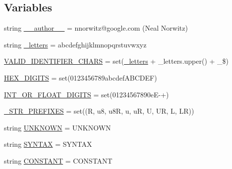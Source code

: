 \subsection*{Variables}
\begin{DoxyCompactItemize}
\item 
string \hyperlink{namespacecpp_1_1tokenize_a13ec118ce7f7df6ecd18b3c74d37708a}{\+\_\+\+\_\+author\+\_\+\+\_\+} = \textquotesingle{}nnorwitz@google.\+com (Neal Norwitz)\textquotesingle{}
\item 
string \hyperlink{namespacecpp_1_1tokenize_ab5a9d36b61d51e76473c383db9e4b934}{\+\_\+letters} = \textquotesingle{}abcdefghijklmnopqrstuvwxyz\textquotesingle{}
\item 
\hyperlink{namespacecpp_1_1tokenize_a733f1cf605b1630fb6a0a7f30aaefbec}{V\+A\+L\+I\+D\+\_\+\+I\+D\+E\+N\+T\+I\+F\+I\+E\+R\+\_\+\+C\+H\+A\+RS} = set(\hyperlink{namespacecpp_1_1tokenize_ab5a9d36b61d51e76473c383db9e4b934}{\+\_\+letters} + \+\_\+letters.\+upper() + \textquotesingle{}\+\_\$\textquotesingle{})
\item 
\hyperlink{namespacecpp_1_1tokenize_a8b45b0f0f2b504757e9ede9c342b2c36}{H\+E\+X\+\_\+\+D\+I\+G\+I\+TS} = set(\textquotesingle{}0123456789abcdef\+A\+B\+C\+D\+E\+F\textquotesingle{})
\item 
\hyperlink{namespacecpp_1_1tokenize_ad8c6dd06d4e6ef2e24e9186acb0aff43}{I\+N\+T\+\_\+\+O\+R\+\_\+\+F\+L\+O\+A\+T\+\_\+\+D\+I\+G\+I\+TS} = set(\textquotesingle{}01234567890e\+E-\/+\textquotesingle{})
\item 
\hyperlink{namespacecpp_1_1tokenize_aef952930004258aec982a51c8875e82a}{\+\_\+\+S\+T\+R\+\_\+\+P\+R\+E\+F\+I\+X\+ES} = set((\textquotesingle{}R\textquotesingle{}, \textquotesingle{}u8\textquotesingle{}, \textquotesingle{}u8R\textquotesingle{}, \textquotesingle{}u\textquotesingle{}, \textquotesingle{}uR\textquotesingle{}, \textquotesingle{}U\textquotesingle{}, \textquotesingle{}UR\textquotesingle{}, \textquotesingle{}L\textquotesingle{}, \textquotesingle{}LR\textquotesingle{}))
\item 
string \hyperlink{namespacecpp_1_1tokenize_a0dfd65c08216eed29f74a64b603ac540}{U\+N\+K\+N\+O\+WN} = \textquotesingle{}U\+N\+K\+N\+O\+WN\textquotesingle{}
\item 
string \hyperlink{namespacecpp_1_1tokenize_a1655e62b60899059935930c81ba25c01}{S\+Y\+N\+T\+AX} = \textquotesingle{}S\+Y\+N\+T\+AX\textquotesingle{}
\item 
string \hyperlink{namespacecpp_1_1tokenize_a5e3bf1014a301906871113a989188a78}{C\+O\+N\+S\+T\+A\+NT} = \textquotesingle{}C\+O\+N\+S\+T\+A\+NT\textquotesingle{}

\end{DoxyCompactItemize}
